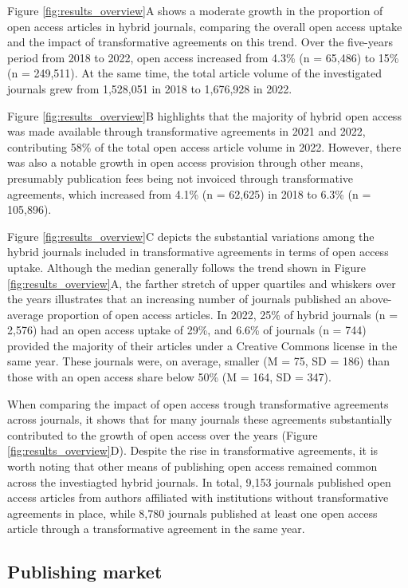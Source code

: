 \documentclass[a4paper,man,floatsintext,longtable,noextraspace,12pt]{apa6}
\begin{document}
Figure \ref{fig:results_overview}A shows a moderate growth in the
proportion of open access articles in hybrid journals, comparing the
overall open access uptake and the impact of transformative agreements
on this trend. Over the five-years period from 2018 to 2022, open access
increased from 4.3\% (n = 65,486) to 15\% (n = 249,511). At the same
time, the total article volume of the investigated journals grew from
1,528,051 in 2018 to 1,676,928 in 2022.

Figure \ref{fig:results_overview}B highlights that the majority of
hybrid open access was made available through transformative agreements
in 2021 and 2022, contributing 58\% of the total open access article
volume in 2022. However, there was also a notable growth in open access
provision through other means, presumably publication fees being not
invoiced through transformative agreements, which increased from 4.1\%
(n = 62,625) in 2018 to 6.3\% (n = 105,896).

Figure \ref{fig:results_overview}C depicts the substantial variations
among the hybrid journals included in transformative agreements in terms
of open access uptake. Although the median generally follows the trend
shown in Figure \ref{fig:results_overview}A, the farther stretch of
upper quartiles and whiskers over the years illustrates that an
increasing number of journals published an above-average proportion of
open access articles. In 2022, 25\% of hybrid journals (n = 2,576) had
an open access uptake of 29\%, and 6.6\% of journals (n = 744) provided
the majority of their articles under a Creative Commons license in the
same year. These journals were, on average, smaller (M = 75, SD = 186)
than those with an open access share below 50\% (M = 164, SD = 347).

When comparing the impact of open access trough transformative
agreements across journals, it shows that for many journals these
agreements substantially contributed to the growth of open access over
the years (Figure \ref{fig:results_overview}D). Despite the rise in
transformative agreements, it is worth noting that other means of
publishing open access remained common across the investiagted hybrid
journals. In total, 9,153 journals published open access articles from
authors affiliated with institutions without transformative agreements
in place, while 8,780 journals published at least one open access
article through a transformative agreement in the same year.

\hypertarget{publishing-market}{%
\subsection{Publishing market}\label{publishing-market}}
\end{document}
